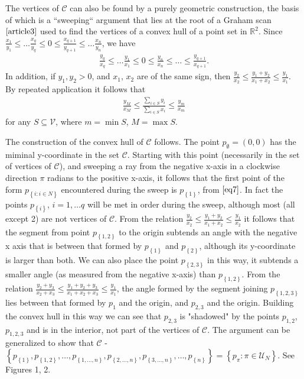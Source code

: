 \documentclass{article}
\theoremstyle{case}
\begin{document}
\vspace{6pt} 
The vertices of $\mathcal{C}$ can also be found by a purely geometric construction, the basis of which is a ``sweeping`` argument that lies at the root of a Graham scan $\cite{article3}$ used to find the vertices of a convex hull of a point set in $\mathbb{R}^2$. Since $\frac{x_1}{y_1} \leq \dots \frac{x_q}{y_q} \leq 0 \leq \frac{x_{q+1}}{y_{q+1}} \leq \dots \frac{x_n}{y_n}$, we have 
\begin{align} \label{eq7}
\frac{y_q}{x_q} \leq \dots \frac{y_1}{x_1} \leq 0 \leq \frac{y_n}{x_n} \leq \dots \leq \frac{y_{q+1}}{x_{q+1}}.
\end{align} 
In addition, if $y_1, y_2 > 0$, and $x_1$, $x_2$ are of the same sign, then $\frac{y_2}{x_2} \leq \frac{y_1+y_2}{x_1+x_2} \leq \frac{y_1}{x_1}.$ By repeated application it follows that
\begin{align} \label{eq8}
\frac{y_M}{x_M} \leq \frac{\sum_{i \in S}y_i}{\sum_{i \in S}x_i} \leq \frac{y_m}{x_m}
\end{align}
for any $S \subseteq \mathcal{V}$, where $m = \min S$, $M = \max S$. 

The construction of the convex hull of $\mathcal{C}$ follows. The point $p_{\emptyset} = \left(0,0\right)$ has the miminal y-coordinate in the set $\mathcal{C}$. Starting with this point (necessarily in the set of vertices of $\mathcal{C}$), and sweeping a ray from the negative x-axis in a clockwise direction $\pi$ radians to the positive x-axis, it follows that the first point of the form $p_{\left\lbrace i \colon i \in N\right\rbrace}$ encountered during the sweep is $p_{\left\lbrace 1 \right\rbrace}$, from $\ref{eq7}$. In fact the points $p_{\left\lbrace i \right\rbrace}$, $i =1, \dots q$ will be met in order during the sweep, although most (all except 2) are not vertices of $\mathcal{C}$. From the relation $\frac{y_2}{x_2} \leq \frac{y_1+y_2}{x_1+x_2} \leq \frac{y_1}{x_2}$ it follows that the segment from point $p_{\left\lbrace 1,2 \right\rbrace}$ to the origin subtends an angle with the negative x axis that is between that formed by $p_{\left\lbrace 1 \right\rbrace}$ and $p_{\left\lbrace 2 \right\rbrace}$, although its y-coordinate is larger than both. We can also place the point $p_{\left\lbrace 2,3 \right\rbrace}$ in this way, it subtends a smaller angle (as measured from the negative x-axis) than $p_{\left\lbrace 1,2 \right\rbrace}$. From the relation $\frac{y_2+y_3}{x_2+x_3} \leq \frac{y_1+y_2+y_3}{x_1+x_2+x_3} \leq \frac{y_1}{x_1}$, the angle formed by the segment joining $p_{\left\lbrace 1, 2, 3\right\rbrace}$ lies between that formed by $p_{1}$ and the origin, and $p_{2,3}$ and the origin. Building the convex hull in this way we can see that $p_{2,3}$ is "shadowed" by the points $p_{1,2}$, $p_{1,2,3}$ and is in the interior, not part of the vertices of $\mathcal{C}$. The argument can be generalized to show that $\mathcal{C}$ - $\left\lbrace p_{\left\lbrace 1\right\rbrace}, p_{\left\lbrace 1,2 \right\rbrace}, \dots, p_{\left\lbrace 1, \dots, n\right\rbrace}, p_{\left\lbrace 2, \dots, n\right\rbrace}, p_{\left\lbrace 3, \dots, n\right\rbrace}, \dots, p_{\left\lbrace n\right\rbrace}\right\rbrace = \left\lbrace p_{\pi} \colon \pi \in \mathcal{U}_N\right\rbrace$. See Figures 1, 2.
\end{document}
